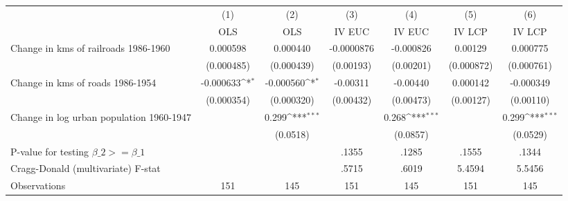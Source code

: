 {
\def\sym#1{\ifmmode^{#1}\else\(^{#1}\)\fi}
\begin{tabular}{l*{6}{c}}
\hline\hline
                &\multicolumn{1}{c}{(1)}&\multicolumn{1}{c}{(2)}&\multicolumn{1}{c}{(3)}&\multicolumn{1}{c}{(4)}&\multicolumn{1}{c}{(5)}&\multicolumn{1}{c}{(6)}\\
                &\multicolumn{1}{c}{OLS}&\multicolumn{1}{c}{OLS}&\multicolumn{1}{c}{IV EUC}&\multicolumn{1}{c}{IV EUC}&\multicolumn{1}{c}{IV LCP}&\multicolumn{1}{c}{IV LCP}\\
\hline
Change in kms of railroads 1986-1960& 0.000598         & 0.000440         &-0.0000876         &-0.000826         &  0.00129         & 0.000775         \\
                &(0.000485)         &(0.000439)         &(0.00193)         &(0.00201)         &(0.000872)         &(0.000761)         \\
[1em]
Change in kms of roads 1986-1954&-0.000633\sym{*}  &-0.000560\sym{*}  & -0.00311         & -0.00440         & 0.000142         &-0.000349         \\
                &(0.000354)         &(0.000320)         &(0.00432)         &(0.00473)         &(0.00127)         &(0.00110)         \\
[1em]
Change in log urban population 1960-1947&                  &    0.299\sym{***}&                  &    0.268\sym{***}&                  &    0.299\sym{***}\\
                &                  & (0.0518)         &                  & (0.0857)         &                  & (0.0529)         \\
\hline
P-value for testing $\beta\_{2} >= \beta\_{1}$&                  &                  &    .1355         &    .1285         &    .1555         &    .1344         \\
Cragg-Donald (multivariate) F-stat&                  &                  &    .5715         &    .6019         &   5.4594         &   5.5456         \\
Observations    &      151         &      145         &      151         &      145         &      151         &      145         \\
\hline\hline
\end{tabular}
}

